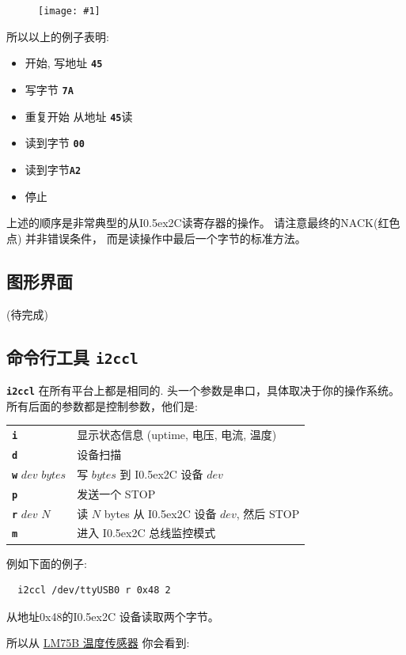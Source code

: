 \documentclass{article}
\newcommand{\two}{\raise0.5ex\hbox{\footnotesize{2}}}
\newcommand{\iic}{I\two{}C}
\newcommand{\png}[1]{
\begin{figure}[H]
\begin{center}
\texttt{[image: \#1]}
\end{center}
\end{figure}
}
\newcommand{\mach}[1]{\texttt{\textbf{#1}}}
\newcommand{\gap}{\vspace{10pt}}
\begin{document}
\png{img/i2cdriver/hero3}

所以以上的例子表明:

\begin{itemize}
\item 开始, 写地址 \mach{45}
\item 写字节 \mach{7A}
\item 重复开始 从地址 \mach{45}读
\item 读到字节 \mach{00}
\item 读到字节\mach{A2}
\item 停止
\end{itemize}

上述的顺序是非常典型的从\iic{}读寄存器的操作。
请注意最终的NACK(红色点) 并非错误条件， 而是读操作中最后一个字节的标准方法。

\subsection{图形界面}

(待完成)

\subsection{命令行工具 \mach{i2ccl}}

\mach{i2ccl} 在所有平台上都是相同的.
头一个参数是串口，具体取决于你的操作系统。 
所有后面的参数都是控制参数，他们是:

\begin{tabular}{ll}
  \mach{i}               & 显示状态信息 (uptime, 电压, 电流, 温度) \\
  \mach{d}               & 设备扫描 \index{bus scan} \\
  \mach{w} $dev$ $bytes$ & 写 $bytes$ 到 \iic{} 设备 $dev$ \\
  \mach{p}               & 发送一个 STOP \\
  \mach{r} $dev$ $N$     & 读 $N$ bytes 从 \iic{} 设备 $dev$, 然后 STOP \\
  \mach{m}               & 进入 \iic{} 总线监控模式 \\
\end{tabular}\gap

例如下面的例子:

\begin{lstlisting}
  i2ccl /dev/ttyUSB0 r 0x48 2
\end{lstlisting}

从地址0x48的\iic{} 设备读取两个字节。

所以从
\href{https://www.nxp.com/docs/en/data-sheet/LM75B.pdf}{LM75B 温度传感器}
你会看到:
\end{document}
